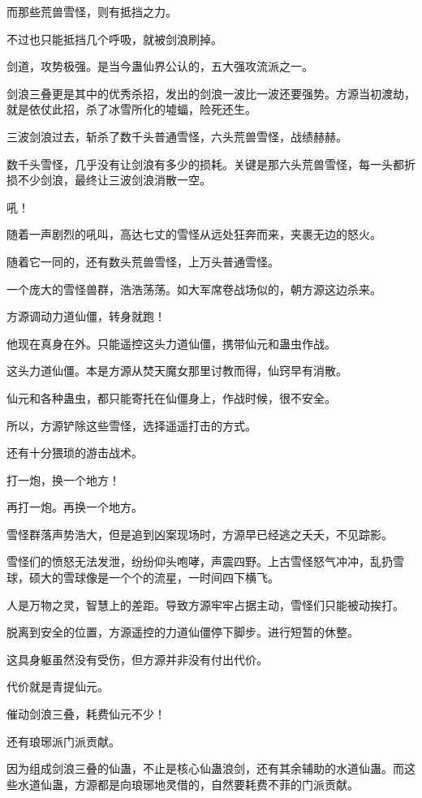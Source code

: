 \begin{this_body}
而那些荒兽雪怪，则有抵挡之力。

不过也只能抵挡几个呼吸，就被剑浪刷掉。

剑道，攻势极强。是当今蛊仙界公认的，五大强攻流派之一。

剑浪三叠更是其中的优秀杀招，发出的剑浪一波比一波还要强势。方源当初渡劫，就是依仗此招，杀了冰雪所化的墟蝠，险死还生。

三波剑浪过去，斩杀了数千头普通雪怪，六头荒兽雪怪，战绩赫赫。

数千头雪怪，几乎没有让剑浪有多少的损耗。关键是那六头荒兽雪怪，每一头都折损不少剑浪，最终让三波剑浪消散一空。

吼！

随着一声剧烈的吼叫，高达七丈的雪怪从远处狂奔而来，夹裹无边的怒火。

随着它一同的，还有数头荒兽雪怪，上万头普通雪怪。

一个庞大的雪怪兽群，浩浩荡荡。如大军席卷战场似的，朝方源这边杀来。

方源调动力道仙僵，转身就跑！

他现在真身在外。只能遥控这头力道仙僵，携带仙元和蛊虫作战。

这头力道仙僵。本是方源从焚天魔女那里讨教而得，仙窍早有消散。

仙元和各种蛊虫，都只能寄托在仙僵身上，作战时候，很不安全。

所以，方源铲除这些雪怪，选择遥遥打击的方式。

还有十分猥琐的游击战术。

打一炮，换一个地方！

再打一炮。再换一个地方。

雪怪群落声势浩大，但是追到凶案现场时，方源早已经逃之夭夭，不见踪影。

雪怪们的愤怒无法发泄，纷纷仰头咆哮，声震四野。上古雪怪怒气冲冲，乱扔雪球，硕大的雪球像是一个个的流星，一时间四下横飞。

人是万物之灵，智慧上的差距。导致方源牢牢占据主动，雪怪们只能被动挨打。

脱离到安全的位置，方源遥控的力道仙僵停下脚步。进行短暂的休整。

这具身躯虽然没有受伤，但方源并非没有付出代价。

代价就是青提仙元。

催动剑浪三叠，耗费仙元不少！

还有琅琊派门派贡献。

因为组成剑浪三叠的仙蛊，不止是核心仙蛊浪剑，还有其余辅助的水道仙蛊。而这些水道仙蛊，方源都是向琅琊地灵借的，自然要耗费不菲的门派贡献。


\end{this_body}
